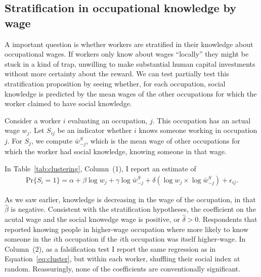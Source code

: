 

\subsection{Stratification in occupational knowledge by wage} 

A important question is whether workers are stratified in their knowledge about occupational wages. 
If workers only know about wages ``locally'' they might be stuck in a kind of trap, unwilling to make substantial human capital investments without more certainty about the reward.  
We can test partially test this stratification proposition by seeing whether, for each occupation, social knowledge is predicted by the mean wages of the other occupations for which the worker claimed to have social knowledge. 

Consider a worker $i$ evaluating an occupation, $j$. 
This occupation has an actual wage $w_j$. 
Let $S_{ij}$ be an indicator whether $i$ knows someone working in occupation $j$. 
For $S_j$, we compute $\bar{w}^S_{-j}$, which is the mean wage of other occupations for which the worker had social knowledge, knowing someone in that wage.  

In Table~\ref{tab:clustering}, Column~(1), I report an estimate of 
\begin{align} \label{eq:cluster}
\mbox{Pr}\{S_i = 1\} = \alpha + \beta \log w_j + \gamma \log \bar{w}^S_{-j} + \delta \left( \log w_j \times \log \bar{w}^S_{-j} \right) + \epsilon_{ij}. 
\end{align} 

 

As we saw earlier, knowledge is decreasing in the wage of the occupation, in that $\hat{\beta}$ is negative. 
Consistent with the stratification hypotheses, the coefficient on the acutal wage and the social knowedge wage is positive, or $\hat{\delta} > 0$. 
Respondents that reported knowing people in higher-wage occupation where more likely to know someone in the $i$th occupation if the $i$th occupation was itself higher-wage. 
In Column~(2), as a falsification test I report the same regression as in Equation~\ref{eq:cluster}, but within each worker, shuffling their social index at random. 
Reassuringly, none of the coefficients are conventionally significant. 
